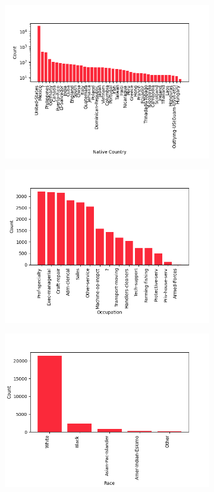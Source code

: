 \documentclass{article}
\begin{document}
\begin{figure}[H]
\begin{subfigure}{0.3\textwidth}
        \includegraphics[width=\linewidth]{img/native-country.png}
    \end{subfigure}
    \begin{subfigure}{0.3\textwidth}
        \includegraphics[width=\linewidth,]{img/occupation.png}
    \end{subfigure}
    \begin{subfigure}{0.3\textwidth}
        \includegraphics[width=\linewidth,]{img/race.png}

\end{subfigure}
\end{figure}
\end{document}
